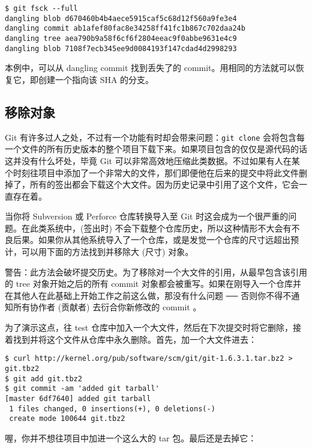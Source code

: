 \documentclass[a4paper]{book}
\begin{document}
\begin{shaded}\begin{verbatim}
$ git fsck --full
dangling blob d670460b4b4aece5915caf5c68d12f560a9fe3e4
dangling commit ab1afef80fac8e34258ff41fc1b867c702daa24b
dangling tree aea790b9a58f6cf6f2804eeac9f0abbe9631e4c9
dangling blob 7108f7ecb345ee9d0084193f147cdad4d2998293
\end{verbatim}\end{shaded}

本例中，可以从 dangling commit 找到丢失了的 commit。用相同的方法就可以恢复它，即创建一个指向该 SHA 的分支。

\subsection{移除对象}

Git 有许多过人之处，不过有一个功能有时却会带来问题：\texttt{git clone} 会将包含每一个文件的所有历史版本的整个项目下载下来。如果项目包含的仅仅是源代码的话这并没有什么坏处，毕竟 Git 可以非常高效地压缩此类数据。不过如果有人在某个时刻往项目中添加了一个非常大的文件，那们即便他在后来的提交中将此文件删掉了，所有的签出都会下载这个大文件。因为历史记录中引用了这个文件，它会一直存在着。

当你将 Subversion 或 Perforce 仓库转换导入至 Git 时这会成为一个很严重的问题。在此类系统中，(签出时) 不会下载整个仓库历史，所以这种情形不大会有不良后果。如果你从其他系统导入了一个仓库，或是发觉一个仓库的尺寸远超出预计，可以用下面的方法找到并移除大 (尺寸) 对象。

警告：此方法会破坏提交历史。为了移除对一个大文件的引用，从最早包含该引用的 tree 对象开始之后的所有 commit 对象都会被重写。如果在刚导入一个仓库并在其他人在此基础上开始工作之前这么做，那没有什么问题 ── 否则你不得不通知所有协作者 (贡献者) 去衍合你新修改的 commit 。

为了演示这点，往 test 仓库中加入一个大文件，然后在下次提交时将它删除，接着找到并将这个文件从仓库中永久删除。首先，加一个大文件进去：

\begin{shaded}\begin{verbatim}
$ curl http://kernel.org/pub/software/scm/git/git-1.6.3.1.tar.bz2 > git.tbz2
$ git add git.tbz2
$ git commit -am 'added git tarball'
[master 6df7640] added git tarball
 1 files changed, 0 insertions(+), 0 deletions(-)
 create mode 100644 git.tbz2
\end{verbatim}\end{shaded}

喔，你并不想往项目中加进一个这么大的 tar 包。最后还是去掉它：
\end{document}
